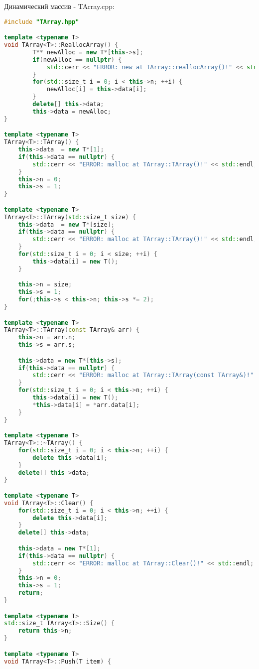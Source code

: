 Динамический массив - TArray.cpp:
\begin{lstlisting}[language=C++]
#include "TArray.hpp"

template <typename T>
void TArray<T>::ReallocArray() {
        T** newAlloc = new T*[this->s];
        if(newAlloc == nullptr) {
            std::cerr << "ERROR: new at TArray::reallocArray()!" << std::endl;
        }
        for(std::size_t i = 0; i < this->n; ++i) {
            newAlloc[i] = this->data[i];
        }
        delete[] this->data;
        this->data = newAlloc;
}

template <typename T>
TArray<T>::TArray() {
    this->data  = new T*[1];
    if(this->data == nullptr) {
        std::cerr << "ERROR: malloc at TArray::TArray()!" << std::endl;
    }
    this->n = 0;
    this->s = 1;
}

template <typename T>
TArray<T>::TArray(std::size_t size) {
    this->data  = new T*[size];
    if(this->data == nullptr) {
        std::cerr << "ERROR: malloc at TArray::TArray()!" << std::endl;
    }
    for(std::size_t i = 0; i < size; ++i) {
        this->data[i] = new T();
    }

    this->n = size;
    this->s = 1;
    for(;this->s < this->n; this->s *= 2);
}

template <typename T>
TArray<T>::TArray(const TArray& arr) {
    this->n = arr.n;
    this->s = arr.s;

    this->data = new T*[this->s];
    if(this->data == nullptr) {
        std::cerr << "ERROR: malloc at TArray::TArray(const TArray&)!" << std::endl;
    }
    for(std::size_t i = 0; i < this->n; ++i) {
        this->data[i] = new T();
        *this->data[i] = *arr.data[i];
    }
}

template <typename T>
TArray<T>::~TArray() {
    for(std::size_t i = 0; i < this->n; ++i) {
        delete this->data[i];
    }
    delete[] this->data;
}

template <typename T>
void TArray<T>::Clear() {
    for(std::size_t i = 0; i < this->n; ++i) {
        delete this->data[i];
    }
    delete[] this->data;

    this->data = new T*[1];
    if(this->data == nullptr) {
        std::cerr << "ERROR: malloc at TArray::Clear()!" << std::endl;
    }
    this->n = 0;
    this->s = 1;
    return;
}

template <typename T>
std::size_t TArray<T>::Size() {
    return this->n;
}

template <typename T>
void TArray<T>::Push(T item) {


\end{lstlisting}
